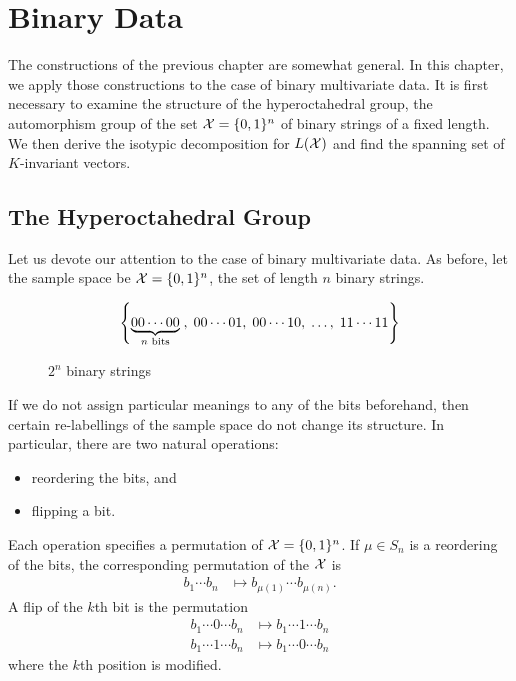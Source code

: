 \documentclass[cclicense]{hmcthesis}
\numberwithin{equation}{chapter}
\numberwithin{ucounter}{chapter}
\begin{document}
\chapter{Binary Data}
    \label{ch:binary}

    The constructions of the previous chapter are somewhat general.  In this
    chapter, we apply those constructions to the case of binary multivariate
    data.  It is first necessary to examine the structure of the hyperoctahedral
    group, the automorphism group of the set $\xs = \{0, 1\}^n$ of binary
    strings of a fixed length.  We then derive the isotypic decomposition for
    $L(\xs)$ and find the spanning set of $K$-invariant vectors.

\section{The Hyperoctahedral Group}
    \label{sec:hyperoctahedral}
    Let us devote our attention to the case of binary multivariate data.  As
    before, let the sample space be $\xs = \{0, 1\}^n$, the set of length $n$
    binary strings.
    \begin{figure}[H]
    \[
        \cdel*{
        \underbrace{00\cdots00}_\text{$n$ bits}\;,\;
        00\cdots01,\;
        00\cdots10,\;
        \ldots,\;
        11\cdots11
        }
    \]
    \caption{$2^n$ binary strings}
    \end{figure}
    If we do not assign particular meanings to any of the bits beforehand, then
    certain re-labellings of the sample space do not change its structure.  In
    particular, there are two natural operations:
    \begin{itemize}\nospace
    \item reordering the bits, and
    \item flipping a bit.
    \end{itemize}
    Each operation specifies a permutation of $\xs = \{0, 1\}^n$.  If $\mu \in
    S_n$ is a reordering of the bits, the corresponding permutation of the
    $\xs$  is
    \begin{align*}
        b_1 \cdots b_n &\mapsto b_{\mu(1)} \cdots b_{\mu(n)}.
    \end{align*}
    A flip of the $k$th bit is the permutation
    \begin{align*}
        b_1 \cdots 0 \cdots b_n 
        &\mapsto
        b_1 \cdots 1 \cdots b_n  \\
        b_1 \cdots 1 \cdots b_n 
        &\mapsto
        b_1 \cdots 0 \cdots b_n
    \end{align*}
    where the $k$th position is modified.  
    
\end{document}
